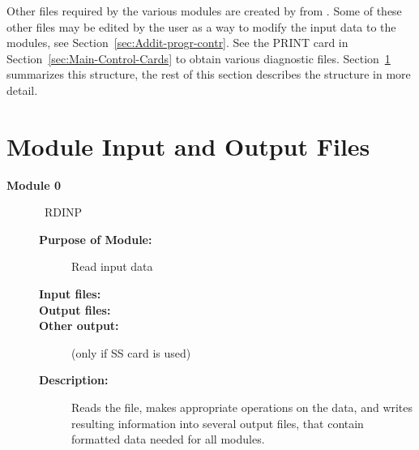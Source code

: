 \documentclass[11pt,oneside]{report} %
\begin{document}
Other files required by the various modules are created by {\feff}
from .  Some of these other files may be edited by the
user as a way to modify the input data to the modules, see
Section~\ref{sec:Addit-progr-contr}.  See the PRINT card in
Section~\ref{sec:Main-Control-Cards} to obtain various diagnostic
files.  Section~\ref{sec:File-structure-code} summarizes this
structure, the rest of this section describes the structure in more
detail.


\section{Module Input and Output Files}
\label{sec:File-structure-code}

\begin{description}
\item[\large\textbf{Module 0}]\dotfill\  {\large\textrm{RDINP}}
  \begin{description}
  \item[\textbf{Purpose of Module:}] Read input data
  \item[\textbf{Input files:}] 
  \item[\textbf{Output files:}] 
  \item[\textbf{Other output:}]  (only if SS card is used)
  \item[\textbf{Description:}] Reads the  file, makes
    appropriate operations on the data, and writes resulting
    information into several output files, that
    contain formatted data needed for all modules.


\end{description}
\end{description}
\end{document}
